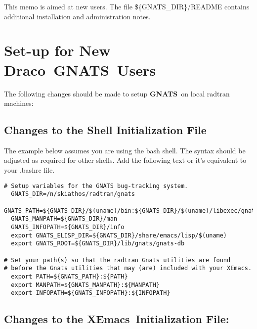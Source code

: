 \documentclass[11pt]{nmemo}
\newcommand{\draco}{{\normalfont\sffamily Draco}}
\newcommand{\xemacs}{{\normalfont\bfseries XEmacs}}
\newcommand{\gnats}{{\normalfont\bfseries GNATS}}
\begin{document}
This memo is aimed at new users.
The file \$\{GNATS\_DIR\}/README
contains additional installation and administration notes.

\section{Set-up for New \draco\ \gnats\ Users}

The following changes should be made to setup \gnats\ on 
local radtran machines:

\subsection {Changes to the Shell Initialization File}

The example below assumes you are using the bash shell.
The syntax should be adjusted as required for other shells.
Add the following text or it's equivalent to your .bashrc file.

\begin{verbatim}
# Setup variables for the GNATS bug-tracking system.
  GNATS_DIR=/n/skiathos/radtran/gnats
  GNATS_PATH=${GNATS_DIR}/$(uname)/bin:${GNATS_DIR}/$(uname)/libexec/gnats
  GNATS_MANPATH=${GNATS_DIR}/man
  GNATS_INFOPATH=${GNATS_DIR}/info
  export GNATS_ELISP_DIR=${GNATS_DIR}/share/emacs/lisp/$(uname)
  export GNATS_ROOT=${GNATS_DIR}/lib/gnats/gnats-db

# Set your path(s) so that the radtran Gnats utilities are found
# before the Gnats utilities that may (are) included with your XEmacs.
  export PATH=${GNATS_PATH}:${PATH}
  export MANPATH=${GNATS_MANPATH}:${MANPATH}
  export INFOPATH=${GNATS_INFOPATH}:${INFOPATH}
\end{verbatim}

\subsection {Changes to the \xemacs\ Initialization File: }
\end{document}
